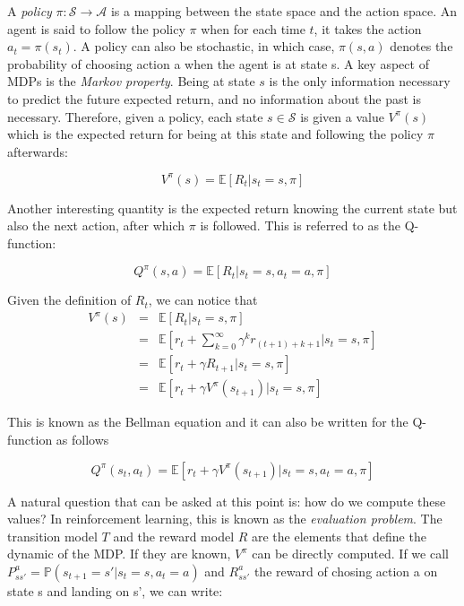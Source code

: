        A \textit{policy} $\pi : \mathcal{S} \rightarrow \mathcal{A}$ is a mapping between the state space and the action space. An agent is said to follow the policy $\pi$ when for each time $t$, it takes the action $a_t = \pi(s_t)$. A policy can also be stochastic, in which case, $\pi (s,a)$ denotes the probability of choosing action a when the agent is at state s. A key aspect of MDPs is the \textit{Markov property}. Being at state $s$ is the only information necessary to predict the future expected return, and no information about the past is necessary. Therefore, given a policy, each state $s \in \mathcal{S}$ is given a value $V^\pi (s)$ which is the expected return for being at this state and following the policy $\pi$ afterwards:
        
        	$$ V^{\pi} (s) = \mathbb{E} [R_t | s_t = s, \pi] $$
            
      	Another interesting quantity is the expected return knowing the current state but also the next action, after which $\pi$ is followed. This is referred to as the Q-function:
        
        	$$ Q^{\pi} (s,a) = \mathbb{E} [R_t | s_t = s, a_t = a, \pi] $$
            
       	Given the definition of $R_t$, we can notice that 
        \begin{eqnarray}
          	V^{\pi} (s)   & = & \mathbb{E} [R_t | s_t = s, \pi] \nonumber \\
           	& = & \mathbb{E} [r_t + \sum_{k=0}^\infty \gamma^k r_{(t+1)+k+1} | s_t = s, \pi] \nonumber \\
            & = & \mathbb{E} [r_t + \gamma R_{t+1} | s_t = s, \pi] \nonumber \\
            & = & \mathbb{E} [r_t + \gamma V^{\pi} (s_{t+1}) | s_t = s, \pi] \nonumber
        \end{eqnarray}
            
     	This is known as the Bellman equation and it can also be written for the Q-function as follows
        
        	$$ Q^{\pi} (s_t,a_t) = \mathbb{E} [r_t + \gamma V^{\pi} (s_{t+1}) | s_t = s, a_t = a, \pi] $$
            
       	A natural question that can be asked at this point is: how do we compute these values? In reinforcement learning, this is known as the \textit{evaluation problem}. The transition model $T$ and the reward model $R$ are the elements that define the dynamic of the MDP. If they are known, $V^{\pi}$ can be directly computed. If we call $P_{ss'}^a = \mathbb{P} (s_{t+1} = s' | s_t = s, a_t = a)$ and $R_{ss'}^a$ the reward of chosing action a on state s and landing on s', we can write:
        

